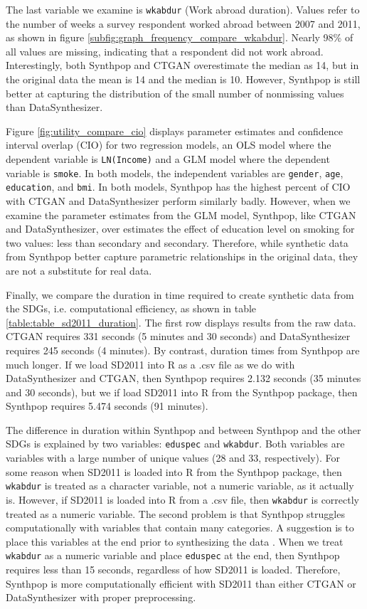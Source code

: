 \documentclass[runningheads]{llncs}
\begin{document}
The last variable we examine is \texttt{wkabdur} (Work abroad duration).  Values refer to the number of weeks a survey respondent worked abroad between 2007 and 2011, as shown in figure \ref{subfig:graph_frequency_compare_wkabdur}.  Nearly 98\% of all values are missing, indicating that a respondent did not work abroad.  Interestingly, both Synthpop and CTGAN overestimate the median as 14, but in the original data the mean is 14 and the median is 10.  However, Synthpop is still better at capturing the distribution of the small number of nonmissing values than DataSynthesizer.

Figure \ref{fig:utility_compare_cio} displays parameter estimates and confidence interval overlap (CIO) for two regression models, an OLS model where the dependent variable is \texttt{LN(Income)} and a GLM model where the dependent variable is \texttt{smoke}.  In both models, the independent variables are \texttt{gender}, \texttt{age}, \texttt{education}, and \texttt{bmi}.  In both models, Synthpop has the highest percent of CIO with CTGAN and DataSynthesizer perform similarly badly.  However, when we examine the parameter estimates from the GLM model, Synthpop, like CTGAN and DataSynthesizer, over estimates the effect of education level on smoking for two values: less than secondary and secondary.  Therefore, while synthetic data from Synthpop better capture parametric relationships in the original data, they are not a substitute for real data.

Finally, we compare the duration in time required to create synthetic data from the SDGs, i.e. computational efficiency, as shown in table \ref{table:table_sd2011_duration}.  The first row displays results from the raw data.  CTGAN requires 331 seconds (5 minutes and 30 seconds) and DataSynthesizer requires 245 seconds (4 minutes).  By contrast, duration times from Synthpop are much longer.  If we load SD2011 into R as a .csv file as we do with DataSynthesizer and CTGAN, then Synthpop requires 2.132 seconds (35 minutes and 30 seconds), but we if load SD2011 into R from the Synthpop package, then Synthpop requires 5.474 seconds (91 minutes).

The difference in duration within Synthpop and between Synthpop and the other SDGs is explained by two variables: \texttt{eduspec} and \texttt{wkabdur}.  Both variables are variables with a large number of unique values (28 and 33, respectively).  For some reason when SD2011 is loaded into R from the Synthpop package, then \texttt{wkabdur} is treated as a character variable, not a numeric variable, as it actually is.  However, if SD2011 is loaded into R from a .csv file, then \texttt{wkabdur} is correctly treated as a numeric variable.  The second problem is that Synthpop struggles computationally with variables that contain many categories.  A suggestion is to place this variables at the end prior to synthesizing the data \cite{raab2017guidelines}.  When we treat \texttt{wkabdur} as a numeric variable and place \texttt{eduspec} at the end, then Synthpop requires less than 15 seconds, regardless of how SD2011 is loaded.  Therefore, Synthpop is more computationally efficient with SD2011 than either CTGAN or DataSynthesizer with proper preprocessing.
\end{document}
